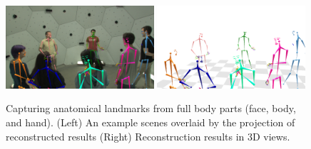 \begin{figure}[h]
	\includegraphics[trim=70 0 70 70,clip,width=0.49\textwidth]{figures/fullmocap/frm_10029}
	\includegraphics[trim=70 0 70 70,clip,width=0.49\textwidth]{figures/fullmocap/frm_10029-2}	
	\caption{Capturing anatomical landmarks from full body parts (face, body, and hand). (Left) An example scenes overlaid by the projection of reconstructed results (Right) Reconstruction results in 3D views. }
	\label{fig:qualitativeFullMocap}
\end{figure}
\vfill


